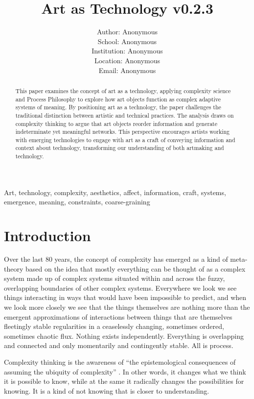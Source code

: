 \documentclass[letterpaper]{article}
\title{Art as Technology v0.2.3}
\author{Author: Anonymous\\
School: Anonymous\\
Institution: Anonymous\\
Location: Anonymous\\
Email: Anonymous\\
\newline
\newline
}
\begin{document}
 
\maketitle
\begin{abstract}

    This paper examines the concept of art as a technology, applying complexity science and Process Philosophy to explore how art objects function as complex adaptive systems of meaning. By positioning art as a technology, the paper challenges the traditional distinction between artistic and technical practices. The analysis draws on complexity thinking to argue that art objects reorder information and generate indeterminate yet meaningful networks. This perspective encourages artists working with emerging technologies to engage with art as a craft of conveying information and context about technology, transforming our understanding of both artmaking and technology.

\end{abstract}


Art, technology, complexity, aesthetics, affect, information, craft, systems, emergence, meaning, constraints, coarse-graining

\section{Introduction}

    Over the last 80 years, the concept of complexity has emerged as a kind of meta-theory based on the idea that mostly everything can be thought of as a complex system made up of complex systems situated within and across the fuzzy, overlapping boundaries of other complex systems. Everywhere we look we see things interacting in ways that would have been impossible to predict, and when we look more closely we see that the things themselves are nothing more than the emergent approximations of interactions between things that are themselves fleetingly stable regularities in a ceaselessly changing, sometimes ordered, sometimes chaotic flux. Nothing exists independently. Everything is overlapping and connected and only momentarily and contingently stable. All is process.
    
    Complexity thinking is the awareness of “the epistemological consequences of assuming the ubiquity of complexity” \citep{CilliersRichardsonCmplxtyScnc2001}. In other words, it changes what we think it is possible to know, while at the same it radically changes the possibilities for knowing. It is a kind of not knowing that is closer to understanding.
    
\end{document}
